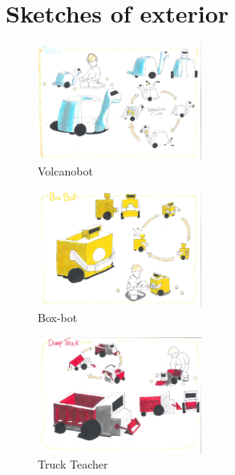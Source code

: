 \documentclass[11pt,twoside,a4paper]{report}
\begin{document}
\section{Sketches of exterior}
\begin{figure}
  \begin{center}
    \includegraphics[width=0.48\textwidth]{Images/VolcanoBotConcept.pdf}
  \end{center}
  \caption{Volcanobot}
  \label{figure:volcanobot2}
\end{figure}
\begin{figure}
  \begin{center}
    \includegraphics[width=0.48\textwidth]{Images/BoxBotConcept.pdf}
  \end{center}
  \caption{Box-bot}
  \label{figure:boxbot2}
\end{figure}
\begin{figure}
  \begin{center}
    \includegraphics[width=0.48\textwidth]{Images/TruckTeacherConcept.pdf}
  \end{center}
  \caption{Truck Teacher}
  \label{figure:truckteacher2}
\end{figure}
\end{document}
